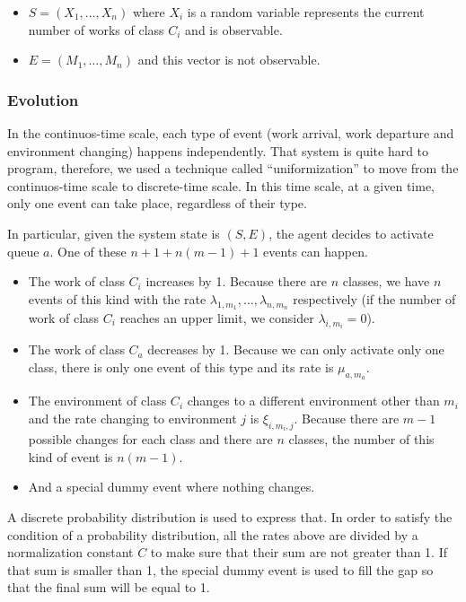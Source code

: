 \documentclass[
  a4paper, xcolor = usenames,dvipsnames]{article}
\providecommand{\tightlist}{%
  \setlength{\itemsep}{0pt}\setlength{\parskip}{0pt}}
\begin{document}
\begin{itemize}
\tightlist
\item
  \(S = (X_{1}, \dots, X_{n})\) where \(X_{i}\) is a random variable represents the current number of works of class \(C_{i}\) and is observable.
\item
  \(E = (M_{1}, \dots, M_{n})\) and this vector is not observable.
\end{itemize}

\hypertarget{evolution}{%
\subsubsection{Evolution}\label{evolution}}

In the continuos-time scale, each type of event (work arrival, work departure and environment changing) happens independently. That system is quite hard to program, therefore, we used a technique called ``uniformization'' to move from the continuos-time scale to discrete-time scale. In this time scale, at a given time, only one event can take place, regardless of their type.

In particular, given the system state is \((S, E)\), the agent decides to activate queue \(a\). One of these \(n + 1 + n(m - 1) + 1\) events can happen.

\begin{itemize}
\tightlist
\item
  The work of class \(C_{i}\) increases by 1. Because there are \(n\) classes, we have \(n\) events of this kind with the rate \(\lambda_{1, m_{1}}, \dots, \lambda_{n, m_{n}}\) respectively (if the number of work of class \(C_{i}\) reaches an upper limit, we consider \(\lambda_{i, m_{i}} = 0\)).
\item
  The work of class \(C_{a}\) decreases by 1. Because we can only activate only one class, there is only one event of this type and its rate is \(\mu_{a, m_{a}}\).
\item
  The environment of class \(C_{i}\) changes to a different environment other than \(m_{i}\) and the rate changing to environment \(j\) is \(\xi_{i, m_{i}, j}\). Because there are \(m - 1\) possible changes for each class and there are \(n\) classes, the number of this kind of event is \(n(m - 1)\).
\item
  And a special dummy event where nothing changes.
\end{itemize}

A discrete probability distribution is used to express that. In order to satisfy the condition of a probability distribution, all the rates above are divided by a normalization constant \(C\) to make sure that their sum are not greater than 1. If that sum is smaller than 1, the special dummy event is used to fill the gap so that the final sum will be equal to 1.
\end{document}
